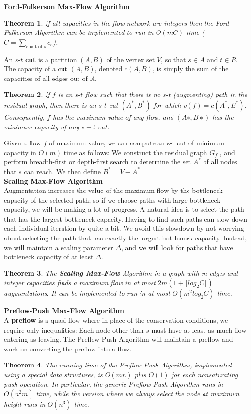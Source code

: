 \documentclass{report}
\newtheorem{Theorem}{Theorem}
\begin{document}
\textbf{Ford-Fulkerson Max-Flow Algorithm}
\begin{Theorem}
If all capacities in the flow network are integers then the Ford-Fulkerson Algorithm can be implemented to run in $O(mC)$ time ($C=\sum_{e \text{ out of } s}c_e$).
\end{Theorem}

An $s\text{-}t$ \textbf{cut} is a partition $(A, B)$ of the vertex set $V$, so that $s \in A$ and $t \in B$. The capacity of a cut $(A, B)$, denoted $c(A, B)$, is simply the sum of the capacities of all edges out of $A$.

\begin{Theorem}
If $f$ is an $s\text{-}t$ flow such that there is no $s\text{-}t$ (augmenting) path in the residual graph, then there is an $s\text{-}t$ cut $(A^*, B^*)$ for which $v(f) = c(A^*, B^*)$. Consequently, $f$ has the maximum value of any flow, and $(A∗, B∗)$ has the minimum capacity of any $s-t$ cut.
\end{Theorem}

Given a flow $f$ of maximum value, we can compute an s-t cut of minimum capacity in $O(m)$ time as follows: We construct the residual graph $G_f$ , and perform breadth-first or depth-first search to
determine the set $A^*$ of all nodes that $s$ can reach. We then define $B^* = V − A^*$.\\

\textbf{Scaling Max-Flow Algorithm}\\
Augmentation increases the value of the maximum flow by the bottleneck capacity of the selected path; so if we choose paths with large bottleneck capacity, we will be making a lot of progress. A natural
idea is to select the path that has the largest bottleneck capacity. Having to find such paths can slow down each individual iteration by quite a bit. We avoid this slowdown by not worrying about selecting the path that has exactly the largest bottleneck capacity. Instead, we will maintain a scaling
parameter $\Delta$, and we will look for paths that have bottleneck capacity of at least $\Delta$.
\begin{Theorem}
	The \textbf{Scaling Max-Flow} Algorithm in a graph with m edges and integer
	capacities finds a maximum flow in at most $2m(1+ \lceil log_2 C\rceil)$ augmentations.
	It can be implemented to run in at most $O(m^2 log_2 C)$ time.
\end{Theorem}

\textbf{Preflow-Push Max-Flow Algorithm}\\
A \textbf{preflow} is a quasi-flow where in place of the conservation conditions, we require only inequalities: Each node other than $s$ must have at least as much flow entering as leaving. The Preflow-Push Algorithm will maintain a preflow and work on converting the preflow into a flow.
\begin{Theorem}
	The running time of the Preflow-Push Algorithm, implemented using
a special data structures, is $O(mn)$ plus $O(1)$ for each nonsaturating push
	operation. In particular, the generic Preflow-Push Algorithm runs in $O(n^2m)$
	time, while the version where we always select the node at maximum height
	runs in $O(n^3)$ time.
\end{Theorem}
\end{document}
